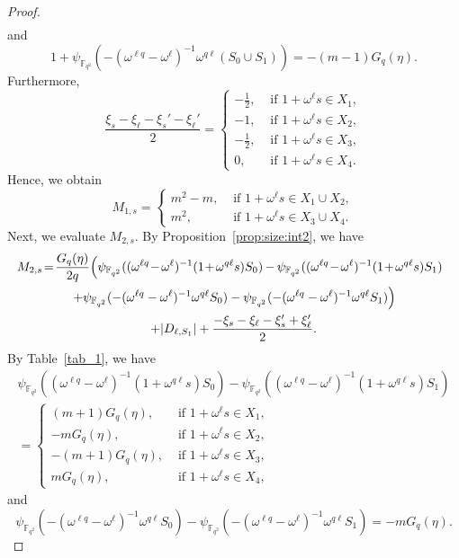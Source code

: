 \documentclass[10pt]{amsart}
\theoremstyle{definition}
\newcommand*\F{{\mathbb F}}
\newcommand*{\mk}{\mkern -1mu}
\newcommand*{\Mk}{\mkern -2mu}
\begin{document}
\begin{proof}
\begin{align*}
\end{align*}
and
\[
1+\psi_{\F_{q^2}}(-(\omega^{\ell q}-\omega^\ell)^{-1}\omega^{q\ell}(S_0\cup S_1))=-(m-1)G_q(\eta).
\]
Furthermore,
\[
\frac{\xi_s-\xi_{\ell}-\xi_s'-\xi_{\ell}'}{2}=
\begin{cases}
-\frac{1}{2},& \text{ if } 1+\omega^{\ell} s\in X_1,\\
-1,& \text{ if } 1+\omega^{\ell} s\in X_2, \\
-\frac{1}{2},& \text{ if }1+\omega^{\ell} s\in X_3,\\
0,& \text{ if } 1+\omega^{\ell} s\in X_4.
\end{cases}
\]
Hence, we obtain
\[
M_{1,s}=
\begin{cases}
m^2-m,& \text{ if } 1+\omega^\ell s\in X_1 \cup X_2,\\
m^2,& \text{ if } 1+\omega^\ell s\in X_3 \cup X_4.
\end{cases}
\]
Next, we evaluate $M_{2,s}$. By Proposition~\ref{prop:size:int2}, we have
\begin{multline}
\!\!\!M_{2,s}\!=\!\frac{G_q(\eta)}{2q}\!\left(\psi_{\F_{q^2}}((\omega^{\ell q}\!-\Mk\omega^\ell)^{-1}(1\!+\Mk\omega^{q\ell} s)S_0)\mk-\mk\psi_{\F_{q^2}}((\omega^{\ell q}\!-\Mk\omega^\ell)^{-1}(1\!+\Mk\omega^{q\ell} s)S_1)\right.\\
\left.+\psi_{\F_{q^2}}(-(\omega^{\ell q}-\omega^\ell)^{-1}\omega^{q\ell}S_0)-\psi_{\F_{q^2}}(-(\omega^{\ell q}-\omega^\ell)^{-1}\omega^{q\ell}S_1)\right)\\
+|D_{\ell,S_1}|+\frac{-\xi_s-\xi_{\ell}-\xi_s'+\xi_{\ell}'}{2}.\label{eq:com14R2}
\end{multline}
By Table~\ref{tab_1}, we have
\begin{multline*}
\psi_{\F_{q^2}}((\omega^{\ell q}-\omega^\ell)^{-1}(1+\omega^{q\ell} s)S_0)-\psi_{\F_{q^2}}((\omega^{\ell q}-\omega^\ell)^{-1}(1+\omega^{q\ell} s)S_1)\\
=\begin{cases}
(m+1)G_{q}(\eta),& \text{ if } 1+\omega^{\ell} s\in X_1,\\
-m G_{q}(\eta),& \text{ if } 1+\omega^{\ell} s\in X_2, \\
-(m+1) G_{q}(\eta),& \text{ if }1+\omega^{\ell} s\in X_3,\\
m G_{q}(\eta),& \text{ if } 1+\omega^{\ell} s\in X_4,
\end{cases}
\end{multline*}
and
\[
\psi_{\F_{q^2}}(-(\omega^{\ell q}-\omega^\ell)^{-1}\omega^{q\ell}S_0)-\psi_{\F_{q^2}}(-(\omega^{\ell q}-\omega^\ell)^{-1}\omega^{q\ell}S_1)=-mG_q(\eta).
\]
\end{proof}
\end{document}
